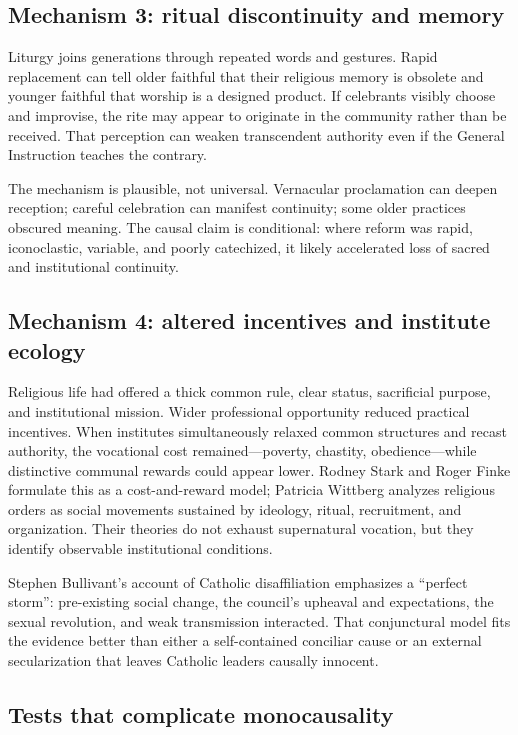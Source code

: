 \subsection{Mechanism 3: ritual discontinuity and memory}

Liturgy joins generations through repeated words and gestures. Rapid replacement can tell older faithful that their religious memory is obsolete and younger faithful that worship is a designed product. If celebrants visibly choose and improvise, the rite may appear to originate in the community rather than be received. That perception can weaken transcendent authority even if the General Instruction teaches the contrary.

The mechanism is plausible, not universal. Vernacular proclamation can deepen reception; careful celebration can manifest continuity; some older practices obscured meaning. The causal claim is conditional: where reform was rapid, iconoclastic, variable, and poorly catechized, it likely accelerated loss of sacred and institutional continuity.

\subsection{Mechanism 4: altered incentives and institute ecology}

Religious life had offered a thick common rule, clear status, sacrificial purpose, and institutional mission. Wider professional opportunity reduced practical incentives. When institutes simultaneously relaxed common structures and recast authority, the vocational cost remained—poverty, chastity, obedience—while distinctive communal rewards could appear lower. Rodney Stark and Roger Finke formulate this as a cost-and-reward model; Patricia Wittberg analyzes religious orders as social movements sustained by ideology, ritual, recruitment, and organization. Their theories do not exhaust supernatural vocation, but they identify observable institutional conditions.

Stephen Bullivant's account of Catholic disaffiliation emphasizes a “perfect storm”: pre-existing social change, the council's upheaval and expectations, the sexual revolution, and weak transmission interacted. That conjunctural model fits the evidence better than either a self-contained conciliar cause or an external secularization that leaves Catholic leaders causally innocent.

\subsection{Tests that complicate monocausality}

